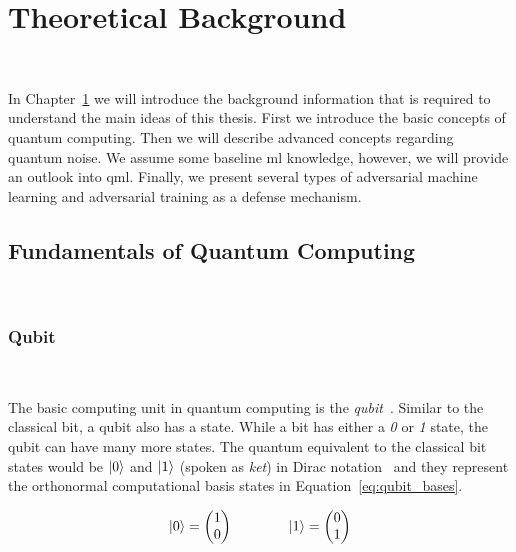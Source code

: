 \chapter{Theoretical Background}\label{chapter:background} \

In Chapter~\ref{chapter:background} we will introduce the
background information that is required to understand
the main ideas of this thesis. First we introduce
the basic concepts of quantum computing. Then we will
describe advanced concepts regarding quantum noise. We
assume some baseline \ac{ml} knowledge, however, we
will provide an outlook into \ac{qml}. Finally, we
present several types of adversarial machine learning
and adversarial training as a defense mechanism. \

\section{Fundamentals of Quantum Computing} \


\subsection{Qubit}\label{subsection:qubit} \

The basic computing unit in quantum computing is the
\textit{qubit}~\cite{schumacher_quantum_1995}. Similar to the classical
bit, a qubit also has a state. While a bit has either a
\textit{0} or \textit{1} state, the qubit can have
many more states. The quantum equivalent to the classical
bit states would be \(\ket{0}\) and \(\ket{1}\) (spoken as \textit{ket}) in Dirac
notation~\cite{dirac_new_1939} and they represent the orthonormal computational
basis states in Equation~\ref{eq:qubit_bases}. \

\begin{equation}\label{eq:qubit_bases}
    \ket{0} = \begin{pmatrix}
                1 \\ 0
              \end{pmatrix} \qquad \qquad
    \ket{1} = \begin{pmatrix}
                0 \\ 1
              \end{pmatrix}
\end{equation} \


